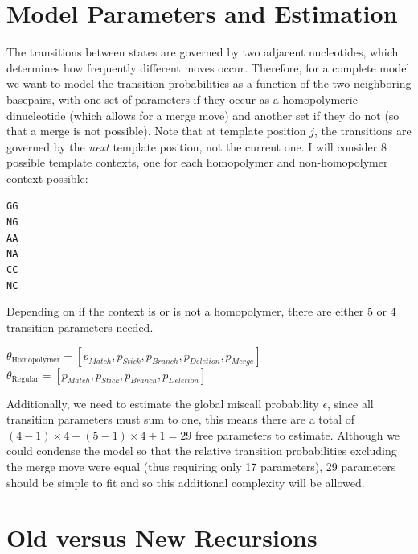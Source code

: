 \documentclass[paper=a4, fontsize=11pt]{scrartcl}
\numberwithin{equation}{section}		%
\numberwithin{figure}{section}			%
\numberwithin{table}{section}				%
\begin{document}
\section{Model Parameters and Estimation}
 
 The transitions between states are governed by two adjacent nucleotides, which determines how frequently different moves occur.  Therefore, for a complete model we want to model the transition probabilities as a function of the two neighboring basepairs, with one set of parameters if they occur as a homopolymeric dinucleotide (which allows for a merge move) and another set if they do not (so that a merge is not possible).  Note that at template position $j$, the transitions are governed by the \textit{next} template position, not the current one.  I will consider 8 possible template contexts, one for each homopolymer and non-homopolymer context possible:
  
 
 \begin{center}
 \texttt{GG \\
NG \\
AA \\
NA \\
CC \\
NC 
 }
 \end{center}
 
 Depending on if the context is or is not a homopolymer, there are either 5 or 4 transition parameters needed.
 
 \begin{center}
$\theta_{\text{Homopolymer}} = [p_{Match}, p_{Stick}, p_{Branch}, p_{Deletion}, p_{Merge} ]$
 \\
$ \theta_{\text{Regular}} = [p_{Match}, p_{Stick}, p_{Branch}, p_{Deletion}]$
\end{center}

Additionally, we need to estimate the global miscall probability $\epsilon$, since all transition parameters must sum to one, this means there are a total of $ (4 -1) \times 4 + (5-1) \times 4 + 1 = 29$ free parameters to estimate.  Although we could condense the model so that the relative transition probabilities excluding the merge move were equal (thus requiring only 17 parameters), 29 parameters should be simple to fit and so this additional complexity will be allowed.  

  
\section{Old versus New Recursions}
\end{document}
